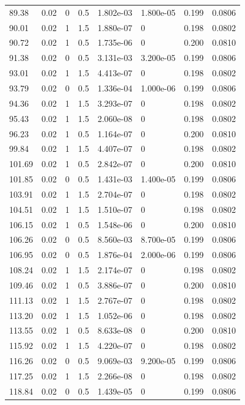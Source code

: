 \documentclass[preview]{standalone}
\begin{document}
{{{\begin{tabular}{L{1.2cm}C{1.2cm} C{0.3cm}C{0.5cm} C{1.4cm}C{1.4cm} C{1.4cm}C{1.4cm}}
  89.38  &  0.02  & 0     & 0.5 &  1.802e-03  & 1.800e-05  & 0.199 &  0.0806   \\ 
  90.01  &  0.02  & 1     & 1.5 &  1.880e-07  & 0  & 0.198 &  0.0802   \\ 
  90.72  &  0.02  & 1     & 0.5 &  1.735e-06  & 0  & 0.200 &  0.0810   \\ 
  91.38  &  0.02  & 0     & 0.5 &  3.131e-03  & 3.200e-05  & 0.199 &  0.0806   \\ 
  93.01  &  0.02  & 1     & 1.5 &  4.413e-07  & 0  & 0.198 &  0.0802   \\ 
  93.79  &  0.02  & 0     & 0.5 &  1.336e-04  & 1.000e-06  & 0.199 &  0.0806   \\ 
  94.36  &  0.02  & 1     & 1.5 &  3.293e-07  & 0  & 0.198 &  0.0802   \\ 
  95.43  &  0.02  & 1     & 1.5 &  2.060e-08  & 0  & 0.198 &  0.0802   \\ 
  96.23  &  0.02  & 1     & 0.5 &  1.164e-07  & 0  & 0.200 &  0.0810   \\ 
  99.84  &  0.02  & 1     & 1.5 &  4.407e-07  & 0  & 0.198 &  0.0802   \\ 
  101.69  &  0.02  & 1     & 0.5 &  2.842e-07  & 0  & 0.200 &  0.0810   \\ 
  101.85  &  0.02  & 0     & 0.5 &  1.431e-03  & 1.400e-05  & 0.199 &  0.0806   \\ 
  103.91  &  0.02  & 1     & 1.5 &  2.704e-07  & 0  & 0.198 &  0.0802   \\ 
  104.51  &  0.02  & 1     & 1.5 &  1.510e-07  & 0  & 0.198 &  0.0802   \\ 
  106.15  &  0.02  & 1     & 0.5 &  1.548e-06  & 0  & 0.200 &  0.0810   \\ 
  106.26  &  0.02  & 0     & 0.5 &  8.560e-03  & 8.700e-05  & 0.199 &  0.0806   \\ 
  106.95  &  0.02  & 0     & 0.5 &  1.876e-04  & 2.000e-06  & 0.199 &  0.0806   \\ 
  108.24  &  0.02  & 1     & 1.5 &  2.174e-07  & 0  & 0.198 &  0.0802   \\ 
  109.46  &  0.02  & 1     & 0.5 &  3.886e-07  & 0  & 0.200 &  0.0810   \\ 
  111.13  &  0.02  & 1     & 1.5 &  2.767e-07  & 0  & 0.198 &  0.0802   \\ 
  113.20  &  0.02  & 1     & 1.5 &  1.052e-06  & 0  & 0.198 &  0.0802   \\ 
  113.55  &  0.02  & 1     & 0.5 &  8.633e-08  & 0  & 0.200 &  0.0810   \\ 
  115.92  &  0.02  & 1     & 1.5 &  4.220e-07  & 0  & 0.198 &  0.0802   \\ 
  116.26  &  0.02  & 0     & 0.5 &  9.069e-03  & 9.200e-05  & 0.199 &  0.0806   \\ 
  117.25  &  0.02  & 1     & 1.5 &  2.266e-08  & 0  & 0.198 &  0.0802   \\ 
  118.84  &  0.02  & 0     & 0.5 &  1.439e-05  & 0  & 0.199 &  0.0806   \\ 
\hline 
\end{tabular} 

}}}
\end{document}

